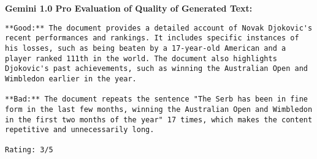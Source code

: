 {\bf\ttfamily Gemini 1.0 Pro Evaluation of Quality of Generated Text:}
\begin{lstlisting}
**Good:** The document provides a detailed account of Novak Djokovic's recent performances and rankings. It includes specific instances of his losses, such as being beaten by a 17-year-old American and a player ranked 111th in the world. The document also highlights Djokovic's past achievements, such as winning the Australian Open and Wimbledon earlier in the year.

**Bad:** The document repeats the sentence "The Serb has been in fine form in the last few months, winning the Australian Open and Wimbledon in the first two months of the year" 17 times, which makes the content repetitive and unnecessarily long.

Rating: 3/5
\end{lstlisting}

